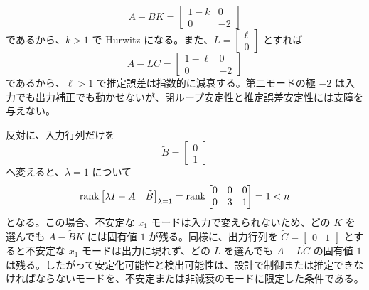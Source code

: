 \begin{equation}
  A-BK=\begin{bmatrix}1-k&0\\0&-2\end{bmatrix}
\end{equation}
であるから、$k>1$ で Hurwitz になる。また、$L=\begin{bmatrix}\ell\\0\end{bmatrix}$ とすれば
\begin{equation}
  A-LC=\begin{bmatrix}1-\ell&0\\0&-2\end{bmatrix}
\end{equation}
であるから、$\ell>1$ で推定誤差は指数的に減衰する。第二モードの極 $-2$ は入力でも出力補正でも動かせないが、閉ループ安定性と推定誤差安定性には支障を与えない。

反対に、入力行列だけを
\begin{equation}
  \tilde{B}=\begin{bmatrix}0\\1\end{bmatrix}
\end{equation}
へ変えると、$\lambda=1$ について
\begin{equation}
  \operatorname{rank}\begin{bmatrix}\lambda I-A&\tilde{B}\end{bmatrix}_{\lambda=1}
  =
  \operatorname{rank}\begin{bmatrix}0&0&0\\0&3&1\end{bmatrix}
  =1<n
\end{equation}
となる。この場合、不安定な $x_1$ モードは入力で変えられないため、どの $K$ を選んでも $A-\tilde{B}K$ には固有値 $1$ が残る。同様に、出力行列を $\tilde{C}=\begin{bmatrix}0&1\end{bmatrix}$ とすると不安定な $x_1$ モードは出力に現れず、どの $L$ を選んでも $A-L\tilde{C}$ の固有値 $1$ は残る。したがって安定化可能性と検出可能性は、設計で制御または推定できなければならないモードを、不安定または非減衰のモードに限定した条件である。
